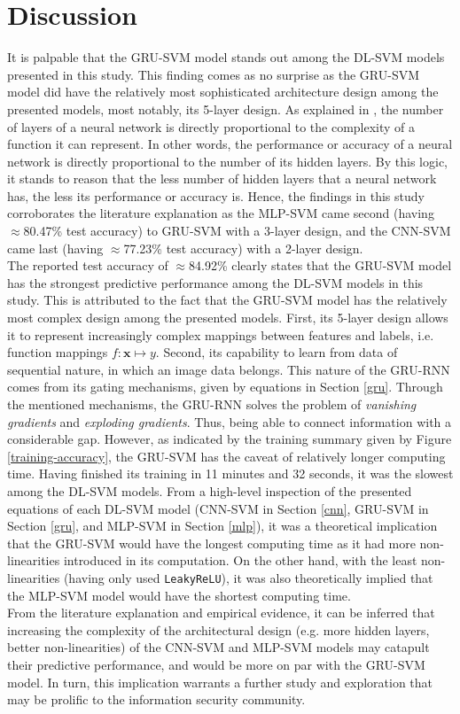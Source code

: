 \documentclass[sigconf]{acmart}
\renewcommand{\vec}[1]{\mathbf{#1}}
\begin{document}
\section{Discussion}
It is palpable that the GRU-SVM model stands out among the DL-SVM models presented in this study. This finding comes as no surprise as the GRU-SVM model did have the relatively most sophisticated architecture design among the presented models, most notably, its 5-layer design. As explained in \cite{Goodfellow-et-al-2016}, the number of layers of a neural network is directly proportional to the complexity of a function it can represent. In other words, the performance or accuracy of a neural network is directly proportional to the number of its hidden layers. By this logic, it stands to reason that the less number of hidden layers that a neural network has, the less its performance or accuracy is. Hence, the findings in this study corroborates the literature explanation as the MLP-SVM came second (having $\approx$80.47\% test accuracy) to GRU-SVM with a 3-layer design, and the CNN-SVM came last (having $\approx$77.23\% test accuracy) with a 2-layer design.\\
\indent	The reported test accuracy of $\approx$84.92\% clearly states that the GRU-SVM model has the strongest predictive performance among the DL-SVM models in this study. This is attributed to the fact that the GRU-SVM model has the relatively most complex design among the presented models. First, its 5-layer design allows it to represent increasingly complex mappings between features and labels, i.e. function mappings $f: \vec{x} \mapsto y$. Second, its capability to learn from data of sequential nature, in which an image data belongs. This nature of the GRU-RNN comes from its gating mechanisms, given by equations in Section \ref{gru}. Through the mentioned mechanisms, the GRU-RNN solves the problem of \textit{vanishing gradients} and \textit{exploding gradients}\cite{Cho}. Thus, being able to connect information with a considerable gap. However, as indicated by the training summary given by Figure \ref{training-accuracy}, the GRU-SVM has the caveat of relatively longer computing time. Having finished its training in 11 minutes and 32 seconds, it was the slowest among the DL-SVM models. From a high-level inspection of the presented equations of each DL-SVM model (CNN-SVM in Section \ref{cnn}, GRU-SVM in Section \ref{gru}, and MLP-SVM in Section \ref{mlp}), it was a theoretical implication that the GRU-SVM would have the longest computing time as it had more non-linearities introduced in its computation. On the other hand, with the least non-linearities (having only used \texttt{LeakyReLU}), it was also theoretically implied that the MLP-SVM model would have the shortest computing time.\\
\indent	From the literature explanation\cite{Goodfellow-et-al-2016} and empirical evidence, it can be inferred that increasing the complexity of the architectural design (e.g. more hidden layers, better non-linearities) of the CNN-SVM and MLP-SVM models may catapult their predictive performance, and would be more on par with the GRU-SVM model. In turn, this implication warrants a further study and exploration that may be prolific to the information security community.
\end{document}
